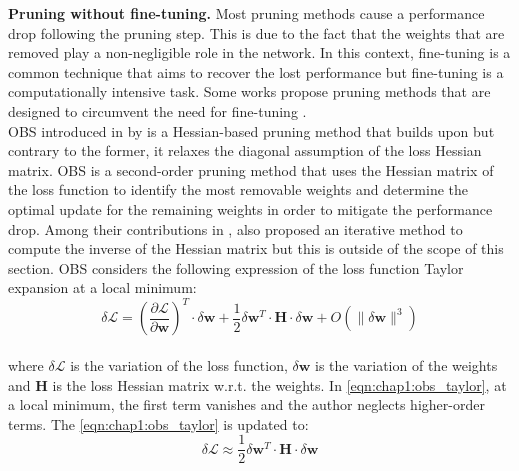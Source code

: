 \noindent\textbf{Pruning without fine-tuning.} Most pruning methods cause a
performance drop following the pruning step. This is due to the fact that the
weights that are removed play a non-negligible role in the network. In this
context, fine-tuning is a common technique that aims to recover the lost
performance but fine-tuning is a computationally intensive task. Some works
propose pruning methods that are designed to circumvent the need for fine-tuning
\cite{DBLP:conf/nips/HassibiS92,DBLP:conf/icnn/HassibiSW93,DBLP:conf/icml/KangH20}.\\


\ac{OBS} introduced in \cite{DBLP:conf/nips/HassibiS92} by
\citeauthor{DBLP:conf/nips/HassibiS92} is a Hessian-based pruning method that
builds upon \cite{DBLP:conf/nips/CunDS89} but contrary to the former, it relaxes
the diagonal assumption of the loss Hessian matrix. \ac{OBS} is a second-order
pruning method that uses the Hessian matrix of the loss function to identify the
most removable weights and determine the optimal update for the remaining
weights in order to mitigate the performance drop. Among their contributions in
\cite{DBLP:conf/nips/HassibiS92}, \cite{DBLP:conf/nips/HassibiS92} also proposed
an iterative method to compute the inverse of the Hessian matrix but this is
outside of the scope of this section. \ac{OBS} considers the following
expression of the loss function Taylor expansion at a local minimum:\\

\begin{equation}
  \label{eqn:chap1:obs_taylor}
  \delta \mathcal{L} = \left( \frac{\partial \mathcal{L}}{\partial \mathbf{w}} \right)^T \cdot  \delta \mathbf{w} + \frac{1}{2} \delta \mathbf{w}^T \cdot \mathbf{H} \cdot \delta \mathbf{w} + O(\| \delta \mathbf{w}\|^3)
\end{equation}\\

\noindent where $\delta \mathcal{L}$ is the variation of the loss function,
$\delta \mathbf{w}$ is the variation of the weights and $\mathbf{H}$ is the loss
Hessian matrix w.r.t. the weights. In \cref{eqn:chap1:obs_taylor}, at a local
minimum, the first term vanishes and the author neglects higher-order terms. The
\cref{eqn:chap1:obs_taylor} is updated to:\\

\begin{equation}
  \label{eqn:chap1:obs_taylor_approx}
  \delta \mathcal{L} \approx \frac{1}{2} \delta \mathbf{w}^T \cdot \mathbf{H} \cdot \delta \mathbf{w} 
\end{equation}\\

